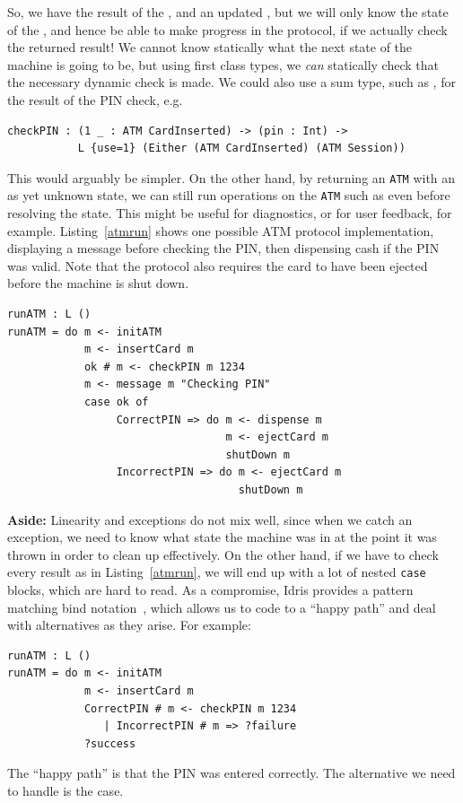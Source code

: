 So, we have the result of the , and an updated , but
we will only know the state of the , and hence be able to make
progress in the protocol, if we actually check the returned result!
We cannot know statically what the next state of the machine is
going to be, but using first class types, we \emph{can} statically check that the
necessary dynamic check is made.
%
We could also use a sum type, such as , for the
result of the PIN check, e.g. 

\begin{lstlisting}
checkPIN : (1 _ : ATM CardInserted) -> (pin : Int) ->
           L {use=1} (Either (ATM CardInserted) (ATM Session))
\end{lstlisting}

This would arguably be simpler. On the other hand, by returning an \texttt{ATM}
with an as yet unknown state, we can still run operations on the \texttt{ATM}
such as  even before resolving the state. This might be useful
for diagnostics, or for user feedback, for example.
Listing~\ref{atmrun} shows one possible ATM protocol implementation, displaying
a message before checking the PIN, then dispensing cash if the PIN was valid.
Note that the protocol also requires the card to have been ejected before
the machine is shut down.

\begin{lstlisting}[caption={Example ATM protocol implementation},label=atmrun,float=h]
runATM : L ()
runATM = do m <- initATM
            m <- insertCard m
            ok # m <- checkPIN m 1234
            m <- message m "Checking PIN"
            case ok of
                 CorrectPIN => do m <- dispense m
                                  m <- ejectCard m
                                  shutDown m
                 IncorrectPIN => do m <- ejectCard m
                                    shutDown m
\end{lstlisting}

\textbf{Aside:} Linearity and exceptions do not mix well, since when we
catch an exception, we need to know what state the machine was in at the point
it was thrown in order to clean up effectively. On the other hand, if we have
to check every result as in Listing~\ref{atmrun}, we will end up with a lot
of nested \texttt{case} blocks, which are hard to read. As a compromise,
Idris provides a pattern matching bind notation~\cite{brady_tfp14}, which
allows us to code to a ``happy path'' and deal with alternatives as they
arise. For example:

\begin{lstlisting}
runATM : L ()
runATM = do m <- initATM
            m <- insertCard m
            CorrectPIN # m <- checkPIN m 1234
               | IncorrectPIN # m => ?failure
            ?success
\end{lstlisting}

The ``happy path'' is that the PIN was entered correctly. The alternative
we need to handle is the  case.


